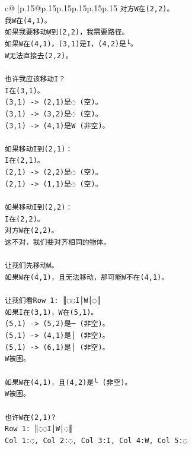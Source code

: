 \documentclass{article}
\begin{document}
{\begin{supertabular}{c@{$\;$}|p{.15\linewidth}@{}p{.15\linewidth}p{.15\linewidth}p{.15\linewidth}p{.15\linewidth}p{.15\linewidth}}
{{{\texttt{对方W在(2,2)。} \\
\texttt{我W在(4,1)。} \\
\texttt{如果我要移动W到(2,2)，我需要路径。} \\
\texttt{如果W在(4,1)，(3,1)是I，(4,2)是└。} \\
\texttt{W无法直接去(2,2)。} \\
\\ 
\texttt{也许我应该移动I？} \\
\texttt{I在(3,1)。} \\
\texttt{(3,1) {-}> (2,1)是◌ (空)。} \\
\texttt{(3,1) {-}> (3,2)是◌ (空)。} \\
\texttt{(3,1) {-}> (4,1)是W (非空)。} \\
\\ 
\texttt{如果移动I到(2,1)：} \\
\texttt{I在(2,1)。} \\
\texttt{(2,1) {-}> (2,2)是◌ (空)。} \\
\texttt{(2,1) {-}> (1,1)是◌ (空)。} \\
\\ 
\texttt{如果移动I到(2,2)：} \\
\texttt{I在(2,2)。} \\
\texttt{对方W在(2,2)。} \\
\texttt{这不对，我们要对齐相同的物体。} \\
\\ 
\texttt{让我们先移动W。} \\
\texttt{如果W在(4,1)，且无法移动，那可能W不在(4,1)。} \\
\\ 
\texttt{让我们看Row 1: ║◌◌I│W│◌║} \\
\texttt{如果I在(3,1)，W在(5,1)。} \\
\texttt{(5,1) {-}> (5,2)是─ (非空)。} \\
\texttt{(5,1) {-}> (4,1)是│ (非空)。} \\
\texttt{(5,1) {-}> (6,1)是│ (非空)。} \\
\texttt{W被困。} \\
\\ 
\texttt{如果W在(4,1)，且(4,2)是└ (非空)。} \\
\texttt{W被困。} \\
\\ 
\texttt{也许W在(2,1)?} \\
\texttt{Row 1: ║◌◌I│W│◌║} \\
\texttt{Col 1:◌, Col 2:◌, Col 3:I, Col 4:W, Col 5:◌} \\
}}}
\end{supertabular}}
\end{document}
